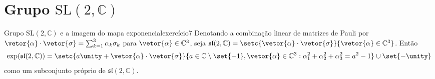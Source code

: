 \section[Grupo SL(2, C)]{Grupo \(\mathrm{SL}(2, \mathbb{C})\)}
\begin{proposition}{Grupo \(\mathrm{SL}(2, \mathbb{C})\) e a imagem do mapa exponencial}{exercício7}
    Denotando a combinação linear de matrizes de Pauli por \(\vetor{\alpha} \cdot \vetor{\sigma} = \sum_{k = 1}^3 \alpha_k \sigma_k\) para \(\vetor{\alpha} \in \mathbb{C}^3\), seja \(\mathfrak{sl}(2,\mathbb{C}) = \setc{\vetor{\alpha}\cdot\vetor{\sigma}}{\vetor{\alpha}\in \mathbb{C}^3}\). Então
    \begin{equation*}
        \exp(\mathfrak{sl}(2,\mathbb{C})) = \setc{a\unity + \vetor{\alpha}\cdot\vetor{\sigma}}{a \in \mathbb{C}\setminus\set{-1}, \vetor{\alpha} \in \mathbb{C}^3 : \alpha_1^2 + \alpha_2^2 + \alpha_3^2 = a^2 - 1}\cup\set{-\unity}
    \end{equation*}
    como um subconjunto próprio de \(\mathfrak{sl}(2,\mathbb{C})\).
\end{proposition}
